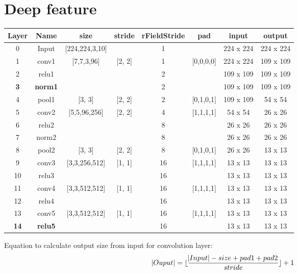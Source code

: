 \documentclass[12pt]{article}
\numberwithin{equation}{section}
\begin{document}
\section{Deep feature \cite{chatfield2014return}}
	\begin{table}[h!]
  		\centering
  		\begin{tabular}{c|c|c|c|c|c|c|c}
   			Layer & Name & size & stride&rFieldStride& pad        & input         & output\\
   			\hline
			0        & Input   &[224,224,3,10]&           &1&              & 224 x 224 & 224 x 224\\ 
			1        & conv1 & [7,7,3,96]       &[2, 2]   &1& [0,0,0,0] & 224 x 224 & 109 x 109\\ 
			2        & relu1   &                       &            &2&               & 109 x 109 & 109 x 109\\ 
	     \textbf{3}  & \textbf{norm1} &                       &           &2&                & 109 x 109 & 109 x 109\\ 
			4        & pool1  & [3, 3]              & [2, 2]   &2& [0,1,0,1]  & 109 x 109  & 54 x 54\\ 
			5        & conv2 & [5,5,96,256]   & [2, 2]   &4&[1,1,1,1]   &  54 x 54    & 26 x 26 \\ 
			6        & relu2   &                       &            &8&                &  26 x 26 &  26 x 26\\ 
			7        & norm2 &                       &            &8&                &  26 x 26 &  26 x 26\\ 
			8        & pool2  & [3, 3]              & [2, 2]   &8& [0,1,0,1]  &  26 x 26 & 13 x 13\\ 
			9        & conv3 & [3,3,256,512] & [1, 1]   &16&[1,1,1,1]   & 13 x 13 & 13 x 13\\ 
			10      & relu3   &                       &            &16&                & 13 x 13 & 13 x 13\\
			11      & conv4 & [3,3,512,512]  & [1, 1]  &16&[1,1,1,1]   & 13 x 13 & 13 x 13\\ 
			12      & relu4   &             		&          &16&                 & 13 x 13 & 13 x 13\\ 
			13      & conv5 & [3,3,512,512]  & [1, 1] &16&[1,1,1,1]    & 13 x 13 & 13 x 13\\ 
	     \textbf{14} & \textbf{relu5}   &                        &          &16&                 & 13 x 13 & 13 x 13\\  
  		\end{tabular}
	\end{table} \par
Equation to calculate output size from input for convolution layer:
\begin{equation}
	\abs{Ouput} = \lfloor{\frac{\abs{Input} - size + pad1 + pad2}{stride}}\rfloor + 1
\end{equation}	
\end{document}
